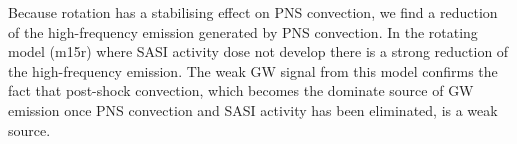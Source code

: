 Because rotation has a stabilising effect on PNS convection, we find a reduction of the high-frequency emission generated
by PNS convection. In the rotating model (m15r) where SASI activity dose not develop there is a strong reduction of the high-frequency
emission. The weak GW signal from this model confirms the fact that post-shock convection, which becomes the dominate source of GW emission once
PNS convection and SASI activity has been eliminated, is a weak source.


